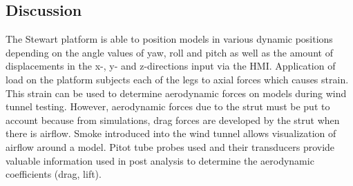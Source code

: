 \subsection{Discussion}
The Stewart platform is able to position models in various dynamic positions depending on the angle values
of yaw, roll and pitch as well as the amount of displacements in the x-, y- and z-directions input via the HMI.
 Application of load on the platform
subjects each of the legs to axial forces which causes strain. This strain can be used to determine aerodynamic forces
on models during wind tunnel testing. However, aerodynamic forces due to the strut must be put to account because from
simulations, drag forces are developed by the strut when there is airflow. Smoke introduced into the wind tunnel allows
visualization of airflow around a model. Pitot tube probes used and their transducers provide valuable information used 
in post analysis to determine the aerodynamic coefficients (drag, lift).